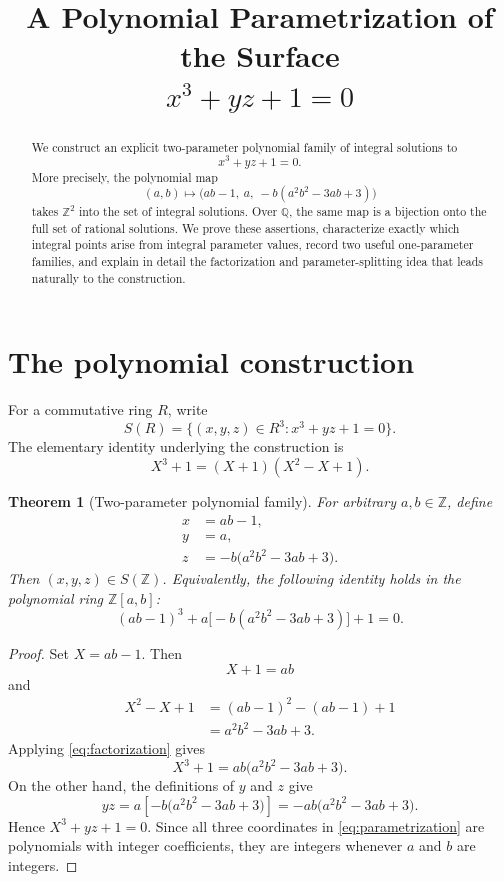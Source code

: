 \documentclass[11pt]{article}
\title{A Polynomial Parametrization of the Surface\\[2mm]
\texorpdfstring{$x^3+yz+1=0$}{x^3+yz+1=0}}
\author{}
\date{}
\newtheorem{theorem}{Theorem}
\theoremstyle{remark}
\newcommand{\Z}{\mathbb{Z}}
\newcommand{\Q}{\mathbb{Q}}
\begin{document}
\maketitle
\vspace{-1.5em}

\begin{abstract}
We construct an explicit two-parameter polynomial family of integral
solutions to
\[
 x^3+yz+1=0.
\]
More precisely, the polynomial map
\[
 (a,b)\longmapsto
 \bigl(ab-1,\ a,\ -b(a^2b^2-3ab+3)\bigr)
\]
takes $\Z^2$ into the set of integral solutions.  Over $\Q$, the same
map is a bijection onto the full set of rational solutions.  We prove
these assertions, characterize exactly which integral points arise
from integral parameter values, record two useful one-parameter
families, and explain in detail the factorization and
parameter-splitting idea that leads naturally to the construction.
\end{abstract}

\section{The polynomial construction}

For a commutative ring $R$, write
\[
 S(R)=\bigl\{(x,y,z)\in R^3:x^3+yz+1=0\bigr\}.
\]
The elementary identity underlying the construction is
\begin{equation}\label{eq:factorization}
 X^3+1=(X+1)(X^2-X+1).
\end{equation}

\begin{theorem}[Two-parameter polynomial family]\label{thm:main}
For arbitrary $a,b\in\Z$, define
\begin{equation}\label{eq:parametrization}
 \boxed{
 \begin{aligned}
 x&=ab-1,\\
 y&=a,\\
 z&=-b\bigl(a^2b^2-3ab+3\bigr).
 \end{aligned}}
\end{equation}
Then $(x,y,z)\in S(\Z)$.  Equivalently, the following identity holds
in the polynomial ring $\Z[a,b]$:
\[
 (ab-1)^3
 +a\bigl[-b(a^2b^2-3ab+3)\bigr]+1=0.
\]
\end{theorem}

\begin{proof}
Set $X=ab-1$.  Then
\[
 X+1=ab
\]
and
\begin{align*}
 X^2-X+1
 &=(ab-1)^2-(ab-1)+1\\
 &=a^2b^2-3ab+3.
\end{align*}
Applying \eqref{eq:factorization} gives
\[
 X^3+1
 =ab\bigl(a^2b^2-3ab+3\bigr).
\]
On the other hand, the definitions of $y$ and $z$ give
\[
 yz
 =a\left[-b\bigl(a^2b^2-3ab+3\bigr)\right]
 =-ab\bigl(a^2b^2-3ab+3\bigr).
\]
Hence $X^3+yz+1=0$.  Since all three coordinates in
\eqref{eq:parametrization} are polynomials with integer coefficients,
they are integers whenever $a$ and $b$ are integers.
\end{proof}
\end{document}
